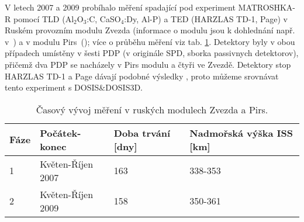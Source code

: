 V letech 2007 a 2009 probíhalo měření spadající pod experiment MATROSHKA-R pomocí TLD (Al$_2$O$_3$:C, CaSO$_4$:Dy, Al-P) a TED (HARZLAS TD-1, Page) v Ruském provozním modulu Zvezda (informace o modulu jsou k dohlednání např. v~\cite{serviceModule}) a v modulu Pirs~(\cite{piers1}); více o průběhu měření viz tab. \ref{tab:dosis_passDetectors_timeline}.  Detektory byly v obou případech umístěny v šesti PDP (v originále SPD, sborka passivnych detektorov), přičemž dva PDP se nacházely v Pirs modulu a čtyři ve Zvezdě. Detektory stop HARZLAS TD-1 a Page dávají podobné výsledky \cite{passDetectors}, proto můžeme srovnávat tento experiment s DOSIS\&DOSIS3D. 
\begin{table}[h]
  \centering
  \caption{Časový vývoj měření v ruských modulech Zvezda a Pirs. \cite{passDetectors}}
  \label{tab:dosis_passDetectors_timeline}
  \begin{tabular}{llll}
	\toprule
	Fáze&Počátek-konec&Doba trvání [dny]&Nadmořská výška ISS [km]\\
	\midrule
	1&Květen-Říjen 2007&163&338-353\\
	2&Květen-Říjen 2009&158&350-361\\
	\bottomrule
  \end{tabular}
\end{table}

